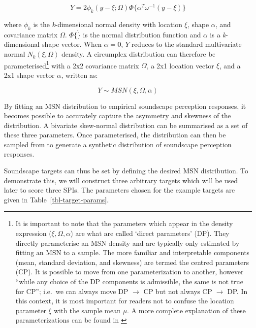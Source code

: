 \documentclass[
  authoryear,
  3p]{elsarticle}
\begin{document}
\[
Y = 2 \phi_k (y-\xi; \Omega) \Phi\{\alpha^T\omega^{-1}(y-\xi)\}
\]

where \(\phi_k\) is the \emph{k}-dimensional normal density with
location \(\xi\), shape \(\alpha\), and covariance matrix \(\Omega\).
\(\Phi \{ \dot \}\) is the normal distribution function and \(\alpha\)
is a \emph{k}-dimensional shape vector. When \(\alpha = 0\), \(Y\)
reduces to the standard multivariate normal \(N_k(\xi, \Omega)\)
density. A circumplex distribution can therefore be
parameterised\footnote{It is important to note that the parameters which
  appear in the density expression (\(\xi, \Omega, \alpha\)) are what
  are called `direct parameters' (DP). They directly parameterise an MSN
  density and are typically only estimated by fitting an MSN to a
  sample. The more familiar and interpretable components (mean, standard
  deviation, and skewness) are termed the centred parameters (CP). It is
  possible to move from one parameterization to another, however ``while
  any choice of the DP components is admissible, the same is not true
  for CP''; i.e.~we can always move DP \(\rightarrow\) CP but not always
  CP \(\rightarrow\) DP. In this context, it is most important for
  readers not to confuse the location parameter \(\xi\) with the sample
  mean \(\mu\). A more complete explanation of these parameterizations
  can be found in \citet{Azzalini2016How}} with a 2x2 covariance matrix
\(\Omega\), a 2x1 location vector \(\xi\), and a 2x1 shape vector
\(\alpha\), written as:

\[
Y \sim MSN (\xi, \Omega, \alpha)
\]

By fitting an MSN distribution to empirical soundscape perception
responses, it becomes possible to accurately capture the asymmetry and
skewness of the distribution. A bivariate skew-normal distribution can
be summarised as a set of these three parameters. Once parameterised,
the distribution can then be sampled from to generate a synthetic
distribution of soundscape perception responses.

Soundscape targets can thus be set by defining the desired MSN
distribution. To demonstrate this, we will construct three arbitrary
targets which will be used later to score three SPIs. The parameters
chosen for the example targets are given in
Table~\ref{tbl-target-params}.
\end{document}
